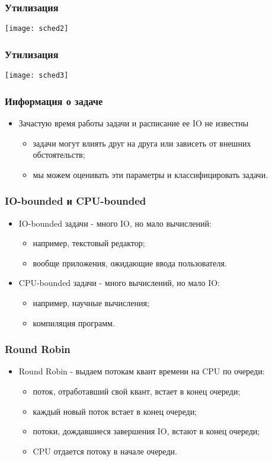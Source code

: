 \begin{frame}
\frametitle{Утилизация}
\texttt{[image: sched2]}
\end{frame}

\begin{frame}
\frametitle{Утилизация}
\texttt{[image: sched3]}
\end{frame}

\begin{frame}
\frametitle{Информация о задаче}
\begin{itemize}
    \item<1->Зачастую время работы задачи и расписание ее IO не известны
    \begin{itemize}
        \item<2->задачи могут влиять друг на друга или зависеть от внешних
             обстоятельств;
        \item<3->мы можем оценивать эти параметры и классифицировать задачи.
    \end{itemize}
\end{itemize}
\end{frame}

\begin{frame}
\frametitle{IO-bounded и CPU-bounded}
\begin{itemize}
    \item<1->IO-bounded задачи - много IO, но мало вычислений:
    \begin{itemize}
        \item<2->например, текстовый редактор;
        \item<2->вообще приложения, ожидающие ввода пользователя.
    \end{itemize}
    \item<3->CPU-bounded задачи - много вычислений, но мало IO:
    \begin{itemize}
        \item<4->например, научные вычисления;
        \item<4->компиляция программ.
    \end{itemize}
\end{itemize}
\end{frame}

\begin{frame}
\frametitle{Round Robin}
\begin{itemize}
    \item<1->Round Robin - выдаем потокам квант времени на CPU по очереди:
    \begin{itemize}
        \item<2->поток, отработавший свой квант, встает в конец очереди;
        \item<3->каждый новый поток встает в конец очереди;
        \item<4->потоки, дождавшиеся завершения IO, встают в конец очереди;
        \item<5->CPU отдается потоку в начале очереди.
    \end{itemize}
\end{itemize}
\end{frame}

